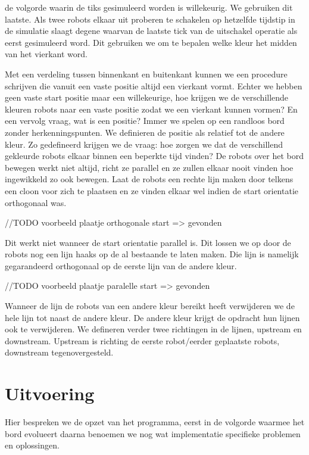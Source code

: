 \documentclass[10pt]{article}
\begin{document}
 de volgorde waarin de tiks gesimuleerd worden is willekeurig. We gebruiken dit laatste. Als twee robots elkaar uit proberen te schakelen op hetzelfde tijdstip in de simulatie slaagt degene waarvan de laatste tick van de uitschakel operatie als eerst gesimuleerd word. Dit gebruiken we om te bepalen welke kleur het midden van het vierkant word.

\label{lijnen}
Met een verdeling tussen binnenkant en buitenkant kunnen we een procedure schrijven die vanuit een vaste positie altijd een vierkant vormt. Echter we hebben geen vaste start positie maar een willekeurige, hoe krijgen we de verschillende kleuren robots naar een vaste positie zodat we een vierkant kunnen vormen? En een vervolg vraag, wat is een positie? Immer we spelen op een randloos bord zonder herkenningspunten. We definieren de positie als relatief tot de andere kleur. Zo gedefineerd krijgen we de vraag: hoe zorgen we dat de verschillend gekleurde robots elkaar binnen een beperkte tijd vinden? De robots over het bord bewegen werkt niet altijd, richt ze parallel en ze zullen elkaar nooit vinden hoe ingewikkeld zo ook bewegen. Laat de robots een rechte lijn maken door telkens een cloon voor zich te plaatsen en ze vinden elkaar wel indien de start orientatie orthogonaal was.

//TODO voorbeeld plaatje orthogonale start => gevonden

Dit werkt niet wanneer de start orientatie parallel is. Dit lossen we op door de robots nog een lijn haaks op de al bestaande te laten maken. Die lijn is namelijk gegarandeerd orthogonaal op de eerste lijn van de andere kleur. 

//TODO voorbeeld plaatje paralelle start => gevonden

Wanneer de lijn de robots van een andere kleur bereikt heeft verwijderen we de hele lijn tot naast de andere kleur. De andere kleur krijgt de opdracht hun lijnen ook te verwijderen. We defineren verder twee richtingen in de lijnen, upstream en downstream. Upstream is richting de eerste robot/eerder geplaatste robots, downstream tegenovergesteld.

\section{Uitvoering}

Hier bespreken we de opzet van het programma, eerst in de volgorde waarmee het bord evolueert daarna benoemen we nog wat implementatie specifieke problemen en oplossingen.
\end{document}
